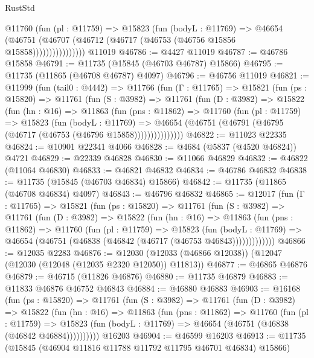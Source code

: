 \begin{lexlean}{RustStd}
\begin{coremodule}
                  @11760
                    (fun (pl : @11759) =>
                    @15823
                      (fun (bodyL : @11769) =>
                      @46654
                        (@46751
                          (@46707 (@46712 (@46717 (@46753 (@46756 @15856 @15858))))))))))))))))
    @11019
@46786 := @4427 @11019
@46787 := @46786 @15858
@46791 := @11735 (@15845 (@46703 @46787) @15866)
@46795 := @11735 (@11865 (@46708 @46787) @4097)
@46796 := @46756 @11019
@46821 := @11999
    (fun (tail0 : @4442) =>
    @11766
      (fun (Γ : @11765) =>
      @15821
        (fun (ps : @15820) =>
        @11761
          (fun (S : @3982) =>
          @11761
            (fun (D : @3982) =>
            @15822
              (fun (hn : @16) =>
              @11863
                (fun (pns : @11862) =>
                @11760
                  (fun (pl : @11759) =>
                  @15823
                    (fun (bodyL : @11769) =>
                    @46654 (@46751 (@46791 (@46795 (@46717 (@46753 (@46796 @15858)))))))))))))))
@46822 := @11023 @22335
@46824 := @10901 @22341 @4066
@46828 := @4684 (@5837 (@4520 @46824)) @4721
@46829 := @22339 @46828
@46830 := @11066 @46829
@46832 := @46822 (@11064 @46830)
@46833 := @46821 @46832
@46834 := @46786 @46832
@46838 := @11735 (@15845 (@46703 @46834) @15866)
@46842 := @11735 (@11865 (@46708 @46834) @4097)
@46843 := @46796 @46832
@46865 := @12017
    (fun (Γ : @11765) =>
    @15821
      (fun (ps : @15820) =>
      @11761
        (fun (S : @3982) =>
        @11761
          (fun (D : @3982) =>
          @15822
            (fun (hn : @16) =>
            @11863
              (fun (pns : @11862) =>
              @11760
                (fun (pl : @11759) =>
                @15823
                  (fun (bodyL : @11769) =>
                  @46654 (@46751 (@46838 (@46842 (@46717 (@46753 @46843)))))))))))))
@46866 := @12035 @2283
@46876 := @12030 (@12033 (@46866 @12038)) (@12047 (@12030 (@12048 (@12035 @2320 @12050)) @11813))
@46877 := @46865 @46876
@46879 := @46715 (@11826 @46876)
@46880 := @11735 @46879
@46883 := @11833 @46876 @46752 @46843
@46884 := @46880 @46883
@46903 := @16168
    (fun (ps : @15820) =>
    @11761
      (fun (S : @3982) =>
      @11761
        (fun (D : @3982) =>
        @15822
          (fun (hn : @16) =>
          @11863
            (fun (pns : @11862) =>
            @11760
              (fun (pl : @11759) =>
              @15823 (fun (bodyL : @11769) => @46654 (@46751 (@46838 (@46842 @46884))))))))))
    @16203
@46904 := @46599 @16203
@46913 := @11735 (@15845 (@46904 @11816 @11788 @11792 @11795 @46701 @46834) @15866)

\end{coremodule}
\end{lexlean}
